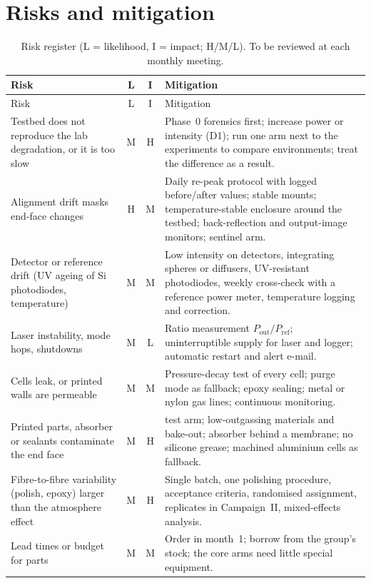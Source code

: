 \section{Risks and mitigation}\label{sec:risks}

\begin{longtable}{@{}L{4.4cm} c c L{8.0cm}@{}}
\caption{Risk register (L = likelihood, I = impact; H/M/L). To be reviewed at each monthly
meeting.}\label{tab:risks}\\
\toprule
Risk & L & I & Mitigation \\
\midrule
\endfirsthead
\toprule
Risk & L & I & Mitigation \\
\midrule
\endhead
\bottomrule
\endfoot
Testbed does not reproduce the lab degradation, or it is too slow & M & H &
Phase~0 forensics first; increase power or intensity (D1); run one arm next to the experiments
to compare environments; treat the difference as a result. \\
Alignment drift masks end-face changes & H & M &
Daily re-peak protocol with logged before/after values; stable mounts; temperature-stable enclosure
around the testbed; back-reflection and output-image monitors; sentinel arm. \\
Detector or reference drift (UV ageing of Si photodiodes, temperature) & M & M &
Low intensity on detectors, integrating spheres or diffusers, UV-resistant photodiodes, weekly cross-check with a
reference power meter, temperature logging and correction. \\
Laser instability, mode hops, shutdowns & M & L &
Ratio measurement $P_\text{out}/P_\text{ref}$; uninterruptible supply for laser and logger; automatic
restart and alert e-mail. \\
Cells leak, or printed walls are permeable & M & M &
Pressure-decay test of every cell; purge mode as fallback; epoxy sealing; metal or nylon gas lines;
continuous \Oxy{} monitoring. \\
Printed parts, absorber or sealants contaminate the end face & M & H &
 test arm; low-outgassing materials and bake-out; absorber behind a membrane; no silicone
grease; machined aluminium cells as fallback. \\
Fibre-to-fibre variability (polish, epoxy) larger than the atmosphere effect & M & H &
Single batch, one polishing procedure, acceptance criteria, randomised assignment, replicates in Campaign~II,
mixed-effects analysis. \\
Lead times or budget for parts & M & M &
Order in month~1; borrow from the group's stock; the core arms need little special equipment. \\

\end{longtable}

